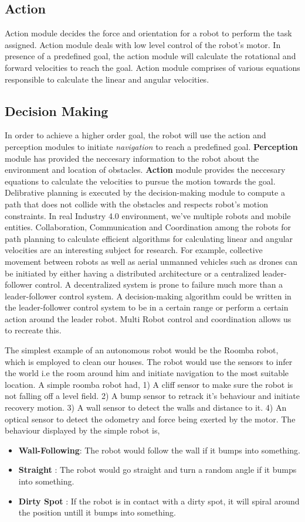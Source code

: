 \subsection{Action}
Action module decides the force and orientation for a robot to perform the task assigned. Action module deals with low level control of the robot's motor. In presence of a predefined goal, 
the action module will calculate the rotational and forward velocities to reach the goal. Action module comprises of various equations responsible to calculate the linear and angular velocities.
\subsection{Decision Making}
In order to achieve a higher order goal, the robot will use the action and perception modules to initiate \textit{navigation} to reach a predefined goal. 
\textbf{Perception} module has provided the neccesary information to the robot about the environment and location of obstacles. \textbf{Action} module provides 
the neccesary equations to calculate the velocities to pursue the motion towards the goal. Delibrative planning is executed by the decision-making module to compute a 
path that does not collide with the obstacles and respects robot's motion constraints. In real Industry 4.0 environment, we've multiple robots and mobile entities. Collaboration, Communication
and Coordination among the robots for path planning to calculate efficient algorithms for calculating linear and angular velocities are an interesting subject for research.
For example, collective movement between robots as well as aerial unmanned vehicles such as drones can be initiated by either having a distributed architecture or a centralized leader-follower control.
A decentralized system is prone to failure much more than a leader-follower control system. A decision-making algorithm could be written in the leader-follower control system to be in a certain range
or perform a certain action around the leader robot. Multi Robot control and coordination allows us to recreate this. 

The simplest example of an autonomous robot would be the Roomba robot, which is employed to clean our houses. The robot would use the sensors to infer the world i.e the room around him and 
initiate navigation to the most suitable location. A simple roomba robot had, 1) A cliff sensor to make sure the robot is not falling off a level field. 2) A bump sensor to retrack it's behaviour and initiate recovery motion. 3) A wall sensor to detect the walls and distance to it. 4) An optical sensor to detect the odometry and force being exerted by the motor.
The behaviour displayed by the simple robot is, 
\begin{itemize}
    \item \textbf{Wall-Following}: The robot would follow the wall if it bumps into something.
    \item \textbf{Straight} : The robot would go straight and turn a random angle if it bumps into something.
    \item \textbf{Dirty Spot} : If the robot is in contact with a dirty spot, it will spiral around the position untill it bumps into something.
\end{itemize}

